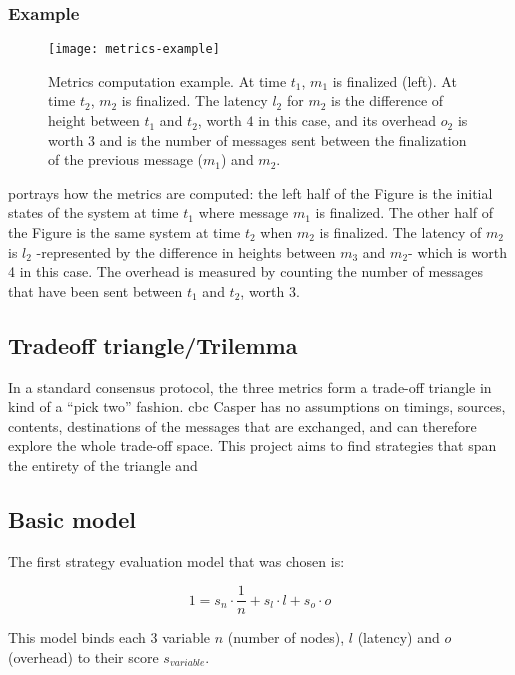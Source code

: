 \subsubsection{Example}

\begin{figure}[h]
	\centering
	\texttt{[image: metrics-example]}
    \caption{Metrics computation example. At time \(t_1\), \(m_1\) is finalized
    (left). At time \(t_2\), \(m_2\) is finalized. The latency \(l_2\) for \(m_2\) is the difference
    of height between \(t_1\) and \(t_2\), worth $4$ in this case, and its
    overhead \(o_2\) is worth $3$ and is the number of messages sent between the
    finalization of the previous message (\(m_1\)) and \(m_2\).}
	\label{fig:metricsSchema}
\end{figure}

 portrays how the metrics are computed: the left half of
the Figure is the initial states of the system at time \(t_1\) where message
\(m_1\) is finalized. The other half of the Figure is the same system at time
\(t_2\) when \(m_2\) is finalized. The latency of \(m_2\) is \(l_2\)
-represented by the difference in heights between \(m_3\) and \(m_2\)- which is
worth 4 in this case. The overhead is measured by counting the number of
messages that have been sent between \(t_1\) and \(t_2\), worth 3.

\FloatBarrier

\subsection{Tradeoff triangle/Trilemma}
In a standard consensus protocol, the three metrics form a trade-off triangle in
kind of a ``pick two'' fashion.  \gls{cbc} Casper has no
assumptions on timings, sources, contents, destinations of the messages that are
exchanged, and can therefore explore the whole trade-off space. This project
aims to find strategies that span the entirety of the triangle and

\subsection{Basic model}
\label{ssec:model}
The first strategy evaluation model that was chosen is:

\[1 = s_n \cdot \frac{1}{n} + s_l\cdot l + s_o\cdot o\]


This model binds each 3 variable \(n\) (number of nodes), \(l\) (latency) and
\(o\) (overhead) to their score \(s_{variable}\).


